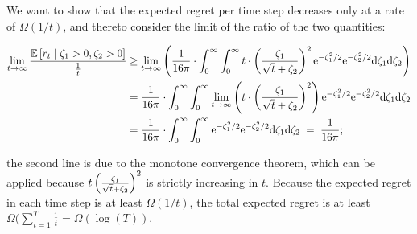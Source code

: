 We want to show that the expected regret per time step decreases only
at a rate of $\Omega(1/t)$, and thereto consider the limit of the
ratio of the two quantities:

\begin{align*}
\lim_{t \to \infty} \frac{\ExpectC{\Regret{t}}{\Noise{1} > 0, \Noise{2} > 0}}{\frac{1}{t}}
  & \geq
    \lim_{t \to \infty} \left( \frac{1}{16\pi} \cdot
    \int_{0}^{\infty} \int_{0}^{\infty}
    t \cdot \left( \frac{\Noise{1}}{\sqrt{t}+\Noise{2}} \right)^2
    \e^{-\Noise{1}^2/2} \e^{-\Noise{2}^2/2} \dd \Noise{1} \dd \Noise{2} \right) \\
  & = \frac{1}{16\pi} \cdot \int_{0}^{\infty} \int_{0}^{\infty}
    \lim_{t \to \infty}
    \left( t \cdot \left( \frac{\Noise{1}}{\sqrt{t}+\Noise{2}} \right)^2 \right)
    \e^{-\Noise{1}^2/2} \e^{-\Noise{2}^2/2} \dd \Noise{1} \dd \Noise{2} \\
  & = \frac{1}{16\pi} \cdot \int_{0}^{\infty} \int_{0}^{\infty}
    \e^{-\Noise{1}^2/2} \e^{-\Noise{2}^2/2} \dd \Noise{1} \dd \Noise{2}
  \; = \; \frac{1}{16 \pi}; 
\end{align*}

the second line is due to the monotone convergence theorem,
which can be applied because
$t \left(\frac{\Noise{1}}{\sqrt{t}+\Noise{2}}\right)^2$
is strictly increasing in $t$.
Because the expected regret in each time step is at least
$\Omega(1/t)$, the total expected regret is at least
$\Omega(\sum_{t=1}^{T}\frac{1}{t} = \Omega(\log(T))$.
